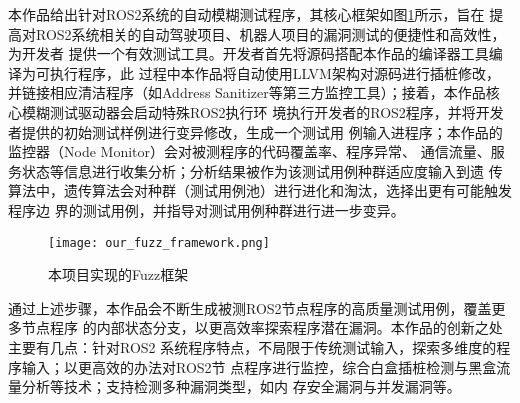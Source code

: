 本作品给出针对ROS2系统的自动模糊测试程序，其核心框架如图\ref{pic:off}所示，旨在
提高对ROS2系统相关的自动驾驶项目、机器人项目的漏洞测试的便捷性和高效性，为开发者
提供一个有效测试工具。开发者首先将源码搭配本作品的编译器工具编译为可执行程序，此
过程中本作品将自动使用LLVM架构对源码进行插桩修改，并链接相应清洁程序（如Address
Sanitizer等第三方监控工具）；接着，本作品核心模糊测试驱动器会启动特殊ROS2执行环
境执行开发者的ROS2程序，并将开发者提供的初始测试样例进行变异修改，生成一个测试用
例输入进程序；本作品的监控器（Node Monitor）会对被测程序的代码覆盖率、程序异常、
通信流量、服务状态等信息进行收集分析；分析结果被作为该测试用例种群适应度输入到遗
传算法中，遗传算法会对种群（测试用例池）进行进化和淘汰，选择出更有可能触发程序边
界的测试用例，并指导对测试用例种群进行进一步变异。

\begin{figure}[H]
    \centering
    \texttt{[image: our\_fuzz\_framework.png]}
    \caption{本项目实现的Fuzz框架}
    \label{pic:off}
\end{figure}

通过上述步骤，本作品会不断生成被测ROS2节点程序的高质量测试用例，覆盖更多节点程序
的内部状态分支，以更高效率探索程序潜在漏洞。本作品的创新之处主要有几点：针对ROS2
系统程序特点，不局限于传统测试输入，探索多维度的程序输入；以更高效的办法对ROS2节
点程序进行监控，综合白盒插桩检测与黑盒流量分析等技术；支持检测多种漏洞类型，如内
存安全漏洞与并发漏洞等。


